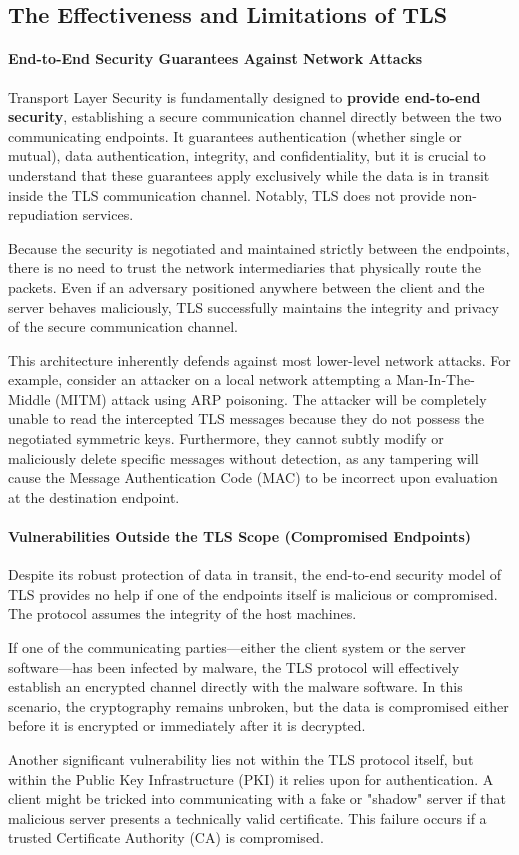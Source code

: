 \subsection{The Effectiveness and Limitations of TLS}

\paragraph{End-to-End Security Guarantees Against Network Attacks}
Transport Layer Security is fundamentally designed to \textbf{provide end-to-end security}, establishing a secure communication channel directly between the two communicating endpoints. It guarantees authentication (whether single or mutual), data authentication, integrity, and confidentiality, but it is crucial to understand that these guarantees apply exclusively while the data is in transit inside the TLS communication channel. Notably, TLS does not provide non-repudiation services.

Because the security is negotiated and maintained strictly between the endpoints, there is no need to trust the network intermediaries that physically route the packets. Even if an adversary positioned anywhere between the client and the server behaves maliciously, TLS successfully maintains the integrity and privacy of the secure communication channel.

This architecture inherently defends against most lower-level network attacks. For example, consider an attacker on a local network attempting a Man-In-The-Middle (MITM) attack using ARP poisoning. The attacker will be completely unable to read the intercepted TLS messages because they do not possess the negotiated symmetric keys. Furthermore, they cannot subtly modify or maliciously delete specific messages without detection, as any tampering will cause the Message Authentication Code (MAC) to be incorrect upon evaluation at the destination endpoint.

\paragraph{Vulnerabilities Outside the TLS Scope (Compromised Endpoints)}
Despite its robust protection of data in transit, the end-to-end security model of TLS provides no help if one of the endpoints itself is malicious or compromised. The protocol assumes the integrity of the host machines.

If one of the communicating parties—either the client system or the server software—has been infected by malware, the TLS protocol will effectively establish an encrypted channel directly with the malware software. In this scenario, the cryptography remains unbroken, but the data is compromised either before it is encrypted or immediately after it is decrypted.

Another significant vulnerability lies not within the TLS protocol itself, but within the Public Key Infrastructure (PKI) it relies upon for authentication. A client might be tricked into communicating with a fake or "shadow" server if that malicious server presents a technically valid certificate. This failure occurs if a trusted Certificate Authority (CA) is compromised.
